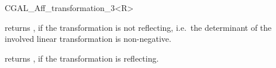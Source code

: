 \begin{classtemplate}{CGAL_Aff_transformation_3<R>}

       {returns , if the transformation is not reflecting,
        i.e.\ the determinant of the involved linear transformation is
        non-negative.}

       {returns , if the transformation is reflecting.}



\end{classtemplate} 


%
%
%
%
%
